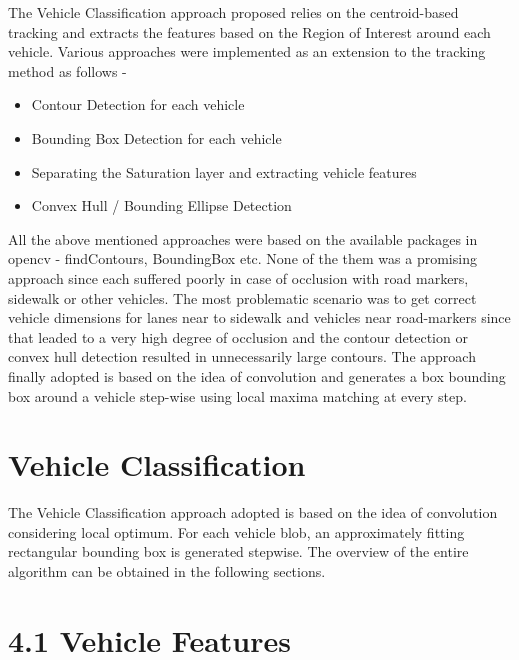 \documentclass[a4paper,12pt]{article}
\begin{document}
\vspace{0.1in}
\begin{flushleft}
The Vehicle Classification approach proposed relies on the centroid-based tracking and extracts the features based on the Region of Interest around each vehicle. Various approaches were implemented as an extension to the tracking method as follows - 
\end{flushleft}

\begin{itemize}
\setlength{\itemindent}{.2in}
\item Contour Detection for each vehicle
\item Bounding Box Detection for each vehicle
\item Separating the Saturation layer and extracting vehicle features
\item Convex Hull / Bounding Ellipse Detection
\end{itemize}
	
\begin{flushleft}
All the above mentioned approaches were based on the available packages in opencv - findContours, BoundingBox etc. None of the them was a promising approach since each suffered poorly in case of occlusion with road markers, sidewalk or other vehicles. The most problematic scenario was to get correct vehicle dimensions for lanes near to sidewalk and vehicles near road-markers since that leaded to a very high degree of occlusion and the contour detection or convex hull detection resulted in unnecessarily large contours. The approach finally adopted is based on the idea of convolution and generates a box bounding box around a vehicle step-wise using local maxima matching at every step. 
\end{flushleft}



\newpage
\section{Vehicle Classification}

The Vehicle Classification approach adopted is based on the idea of convolution considering local optimum. For each vehicle blob, an approximately fitting rectangular bounding box is generated stepwise. The overview of the entire algorithm can be obtained in the following sections.

\section*{\large 4.1 Vehicle Features}
\vspace{0.1in}
\end{document}

